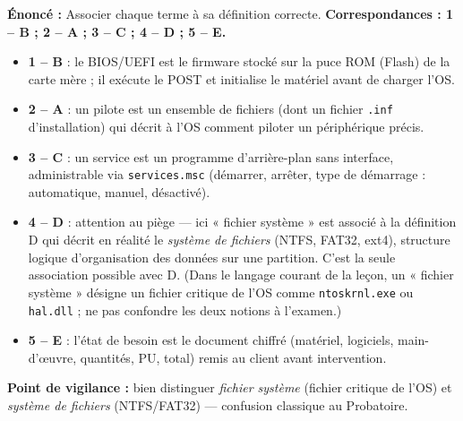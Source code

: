 \documentclass[11pt]{article}
\begin{document}
\begin{corrige}
\textbf{Énoncé :} Associer chaque terme à sa définition correcte.
\tcblower
\textbf{Correspondances : 1 -- B ; 2 -- A ; 3 -- C ; 4 -- D ; 5 -- E.}

\begin{itemize}
    \item \textbf{1 -- B} : le BIOS/UEFI est le firmware stocké sur la puce ROM (Flash) de la carte mère ; il exécute le POST et initialise le matériel avant de charger l'OS.
    \item \textbf{2 -- A} : un pilote est un ensemble de fichiers (dont un fichier \texttt{.inf} d'installation) qui décrit à l'OS comment piloter un périphérique précis.
    \item \textbf{3 -- C} : un service est un programme d'arrière-plan sans interface, administrable via \texttt{services.msc} (démarrer, arrêter, type de démarrage : automatique, manuel, désactivé).
    \item \textbf{4 -- D} : attention au piège — ici « fichier système » est associé à la définition D qui décrit en réalité le \emph{système de fichiers} (NTFS, FAT32, ext4), structure logique d'organisation des données sur une partition. C'est la seule association possible avec D. (Dans le langage courant de la leçon, un « fichier système » désigne un fichier critique de l'OS comme \texttt{ntoskrnl.exe} ou \texttt{hal.dll} ; ne pas confondre les deux notions à l'examen.)
    \item \textbf{5 -- E} : l'état de besoin est le document chiffré (matériel, logiciels, main-d'œuvre, quantités, PU, total) remis au client avant intervention.
\end{itemize}

\textbf{Point de vigilance :} bien distinguer \emph{fichier système} (fichier critique de l'OS) et \emph{système de fichiers} (NTFS/FAT32) — confusion classique au Probatoire.
\end{corrige}
\end{document}
